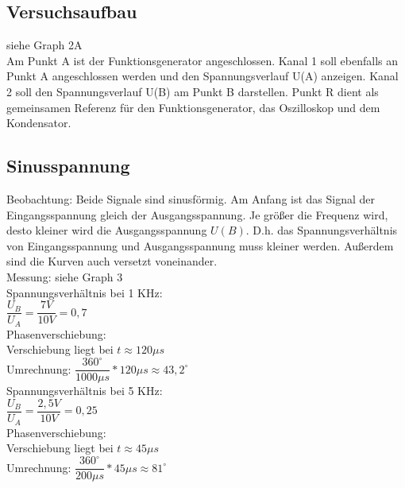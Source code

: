\documentclass[paper=a4, fontsize=11pt]{scrartcl}
\numberwithin{equation}{section}
\numberwithin{figure}{section}
\numberwithin{table}{section}
\begin{document}
\subsection{Versuchsaufbau}

siehe Graph 2A \\

Am Punkt A ist der Funktionsgenerator angeschlossen. Kanal 1 soll ebenfalls an Punkt A angeschlossen werden und den Spannungsverlauf U(A) anzeigen. Kanal 2 soll den Spannungsverlauf U(B) am Punkt B darstellen. Punkt R dient als gemeinsamen Referenz für den Funktionsgenerator, das Oszilloskop und dem Kondensator.

\subsection{Sinusspannung}

Beobachtung: Beide Signale sind sinusförmig. Am Anfang ist das Signal der Eingangsspannung gleich der Ausgangsspannung. Je größer die Frequenz wird, desto kleiner wird die Ausgangsspannung $U(B)$. D.h. das Spannungsverhältnis von Eingangsspannung und Ausgangsspannung muss kleiner werden. Außerdem sind die Kurven auch versetzt voneinander. \\

Messung: siehe Graph 3 \\

Spannungsverhältnis bei 1 KHz: \\

$\dfrac{U_{B}}{U_{A}} = \dfrac{7V}{10V} = 0,7$ \\

Phasenverschiebung: \\

Verschiebung liegt bei $t \approx 120 \mu s$ \\

Umrechnung: $\dfrac{360 ^{\circ}}{1000 \mu s} * 120 \mu s \approx 43,2 ^{\circ}$ \\

Spannungsverhältnis bei 5 KHz: \\

$\dfrac{U_{B}}{U_{A}} = \dfrac{2,5V}{10V} = 0,25$ \\

Phasenverschiebung: \\

Verschiebung liegt bei $t \approx 45 \mu s$ \\

Umrechnung: $\dfrac{360 ^{\circ}}{200 \mu s} * 45 \mu s \approx 81 ^{\circ}$ \\
\end{document}
